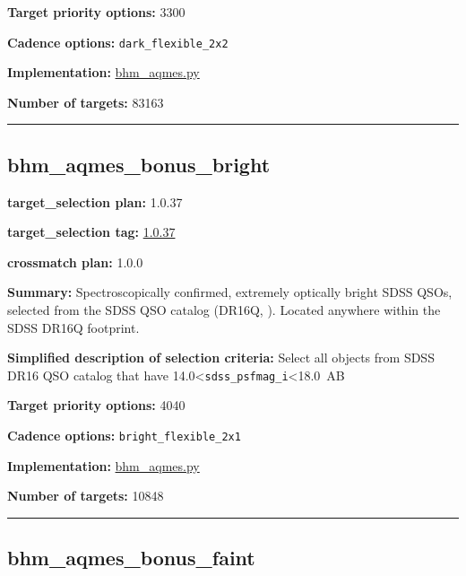 \noindent\textbf{Target priority options:} 3300

\noindent\textbf{Cadence options:} \texttt{dark\_flexible\_2x2}

\noindent\textbf{Implementation:}
\href{https://github.com/sdss/target_selection/blob/1.0.37/python/target_selection/cartons/bhm_aqmes.py}{bhm\_aqmes.py}

\noindent\textbf{Number of targets:} 83163

\begin{center}\rule{0.5\linewidth}{0.5pt}\end{center}

\hypertarget{bhm_aqmes_bonus_bright_plan1.0.37}{%
\subsection{bhm\_aqmes\_bonus\_bright}\label{bhm_aqmes_bonus_bright_plan1.0.37}}

\noindent\textbf{target\_selection plan:} 1.0.37

\noindent\textbf{target\_selection tag:}
\href{https://github.com/sdss/target_selection/tree/1.0.37/}{1.0.37}

\noindent\textbf{crossmatch plan:} 1.0.0

\noindent\textbf{Summary:} Spectroscopically confirmed, extremely optically
bright SDSS QSOs, selected from the SDSS QSO catalog (DR16Q,
\citealt{Lyke2020}). Located anywhere within the SDSS DR16Q footprint.

\noindent\textbf{Simplified description of selection criteria:} Select all
objects from SDSS DR16 QSO catalog that have
14.0\textless{}\texttt{sdss\_psfmag\_i}\textless18.0~AB


\noindent\textbf{Target priority options:} 4040

\noindent\textbf{Cadence options:} \texttt{bright\_flexible\_2x1}

\noindent\textbf{Implementation:}
\href{https://github.com/sdss/target_selection/blob/1.0.37/python/target_selection/cartons/bhm_aqmes.py}{bhm\_aqmes.py}

\noindent\textbf{Number of targets:} 10848

\begin{center}\rule{0.5\linewidth}{0.5pt}\end{center}

\hypertarget{bhm_aqmes_bonus_faint_plan1.0.37}{%
\subsection{bhm\_aqmes\_bonus\_faint}\label{bhm_aqmes_bonus_faint_plan1.0.37}}

